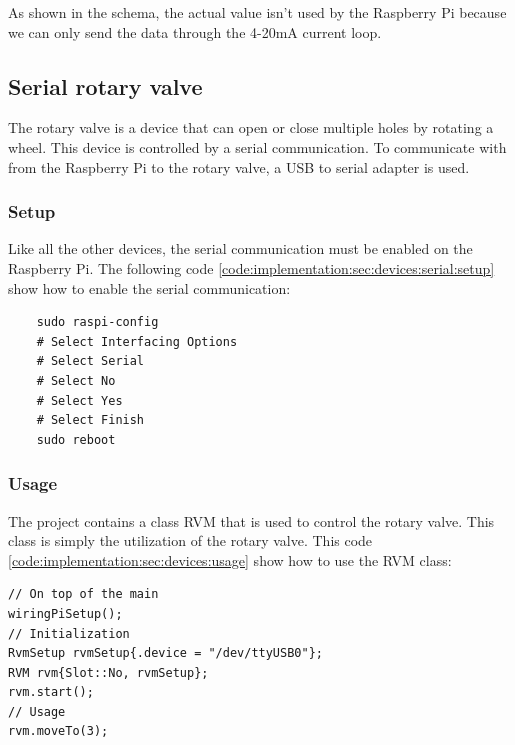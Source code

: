 As shown in the schema, the actual value isn't used by the Raspberry Pi because we can only send the data through the 4-20mA current loop.


\subsection{Serial rotary valve}
\label{ch:implementation:sec:devices:serial}

The rotary valve is a device that can open or close multiple holes by rotating a wheel.
This device is controlled by a serial communication.
To communicate with from the Raspberry Pi to the rotary valve, a USB to serial adapter is used.

\subsubsection{Setup}
\label{ch:implementation:sec:devices:serial:setup}

Like all the other devices, the serial communication must be enabled on the Raspberry Pi.
The following code \ref{code:implementation:sec:devices:serial:setup} show how to enable the serial communication:

\begin{code}
  \label{code:implementation:sec:devices:serial:setup}
  \begin{verbatim}
    sudo raspi-config
    # Select Interfacing Options
    # Select Serial
    # Select No
    # Select Yes
    # Select Finish
    sudo reboot
  \end{verbatim}
\end{code}

\subsubsection{Usage}
\label{ch:implementation:sec:devices:usage}

The project contains a class RVM that is used to control the rotary valve.
This class is simply the utilization of the rotary valve.
This code \ref{code:implementation:sec:devices:usage} show how to use the RVM class:

\begin{code}
  \label{code:implementation:sec:devices:usage}
  \begin{verbatim}
// On top of the main
wiringPiSetup();
// Initialization
RvmSetup rvmSetup{.device = "/dev/ttyUSB0"};
RVM rvm{Slot::No, rvmSetup};
rvm.start();
// Usage
rvm.moveTo(3);
  \end{verbatim}
\end{code}

